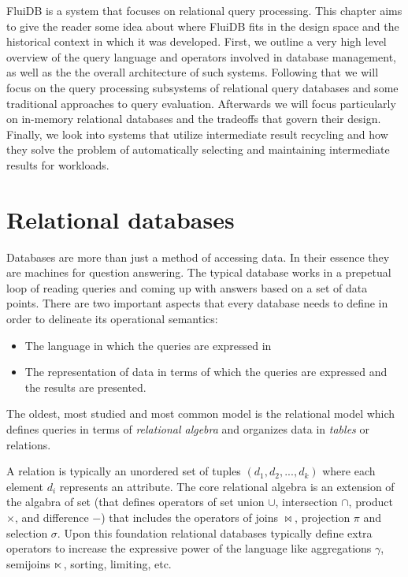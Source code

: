 
FluiDB is a system that focuses on relational query processing. This
chapter aims to give the reader some idea about where FluiDB fits in
the design space and the historical context in which it was developed.
First, we outline a very high level overview of the query language and
operators involved in database management, as well as the the overall
architecture of such systems. Following that we will focus on the
query processing subsystems of relational query databases and some
traditional approaches to query evaluation. Afterwards we will focus
particularly on in-memory relational databases and the tradeoffs that
govern their design. Finally, we look into systems that utilize
intermediate result recycling and how they solve the problem of
automatically selecting and maintaining intermediate results for
workloads.

\section{Relational databases}
\label{sec:org5af5e27}
Databases are more than just a method of accessing data. In their
essence they are machines for question answering. The typical database
works in a prepetual loop of reading queries and coming up with
answers based on a set of data points. There are two important aspects
that every database needs to define in order to delineate its
operational semantics:

\begin{itemize}
\item The language in which the queries are expressed in
\item The representation of data in terms of which the queries are
expressed and the results are presented.
\end{itemize}

The oldest, most studied and most common model is the relational model
which defines queries in terms of \emph{relational algebra} and organizes
data in \emph{tables} or relations.

A relation is typically an unordered set of tuples
\((d_1,d_2,...,d_k)\) where each element \(d_i\) represents an
attribute. The core relational algebra is an extension of the algabra
of set (that defines operators of set union \(\cup\), intersection
\(\cap\), product \(\times\), and difference \(-\)) that includes the
operators of joins \(\Join\), projection \(\pi\) and selection
\(\sigma\). Upon this foundation relational databases typically define
extra operators to increase the expressive power of the language like
aggregations \(\gamma\), semijoins \(\ltimes\), sorting, limiting, etc.

